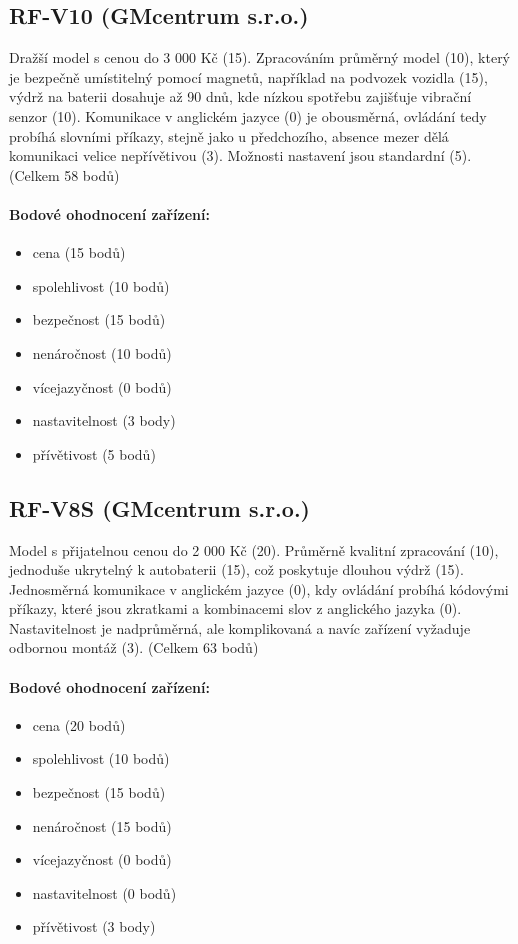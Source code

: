 \documentclass[FM,BP]{tulthesis}  %
\begin{document}
\subsection{RF-V10 (GMcentrum s.r.o.)}
Dražší model s cenou do 3 000 Kč (15). Zpracováním průměrný model (10), který je bezpečně umístitelný pomocí magnetů, například na podvozek vozidla (15), výdrž na baterii dosahuje až 90 dnů, kde nízkou spotřebu zajišťuje vibrační senzor (10). Komunikace v anglickém jazyce (0) je obousměrná, ovládání tedy probíhá slovními příkazy, stejně jako u předchozího, absence mezer dělá komunikaci velice nepřívětivou (3). Možnosti nastavení jsou standardní (5). (Celkem 58 bodů)

\paragraph{Bodové ohodnocení zařízení:}
\begin{itemize}
\item cena (15 bodů)
\item spolehlivost (10 bodů)
\item bezpečnost (15 bodů)
\item nenáročnost (10 bodů)
\item vícejazyčnost (0 bodů)
\item nastavitelnost (3 body)
\item přívětivost (5 bodů)
\end{itemize}

\subsection{RF-V8S (GMcentrum s.r.o.)}
Model s přijatelnou cenou do 2 000 Kč (20). Průměrně kvalitní zpracování (10), jednoduše ukrytelný k autobaterii (15), což poskytuje dlouhou výdrž (15). Jednosměrná komunikace v anglickém jazyce (0), kdy ovládání probíhá kódovými příkazy, které jsou zkratkami a kombinacemi slov z anglického jazyka (0). Nastavitelnost je nadprůměrná, ale komplikovaná a navíc zařízení vyžaduje odbornou montáž (3). (Celkem 63 bodů)

\paragraph{Bodové ohodnocení zařízení:}
\begin{itemize}
\item cena (20 bodů)
\item spolehlivost (10 bodů)
\item bezpečnost (15 bodů)
\item nenáročnost (15 bodů)
\item vícejazyčnost (0 bodů)
\item nastavitelnost (0 bodů)
\item přívětivost (3 body)
\end{itemize}
\end{document}
